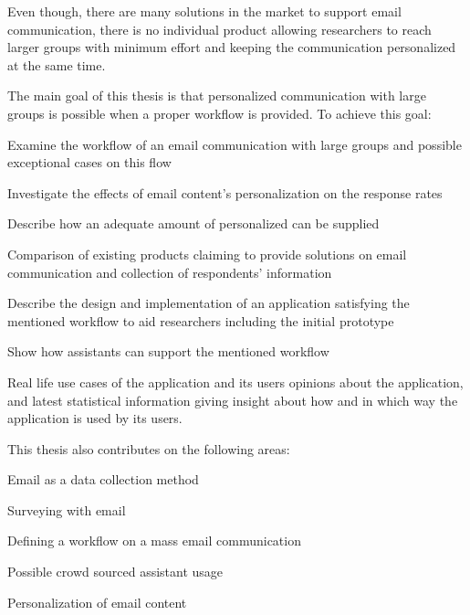 Even though, there are many solutions in the market to support email communication, there is no individual product allowing researchers to reach larger groups with minimum effort and keeping the communication personalized at the same time.
\vspace{1cm}

The main goal of this thesis is that personalized communication with large groups is possible when a proper workflow is provided. To achieve this goal:

\begin{compactenum}
	\item Examine the workflow of an email communication with large groups and possible exceptional cases on this flow
	\item Investigate the effects of email content's personalization on the response rates
	\item Describe how an adequate amount of personalized can be supplied
	\item Comparison of  existing products claiming to provide solutions on email communication and collection of respondents' information
	\item Describe the design and implementation of an application satisfying the mentioned workflow to aid researchers including the initial prototype
	\item Show how assistants can support the mentioned workflow  
	\item Real life use cases of the application and its users opinions about the application, and latest statistical information giving insight about how and in which way the application is used by its users.
\end{compactenum}
\vspace{1cm}

This thesis also contributes on the following areas:

\begin{compactenum}
	\item Email as a data collection method
	\item Surveying with email
	\item Defining a workflow on a mass email communication
	\item Possible crowd sourced assistant usage
	\item Personalization of email content
\end{compactenum}


